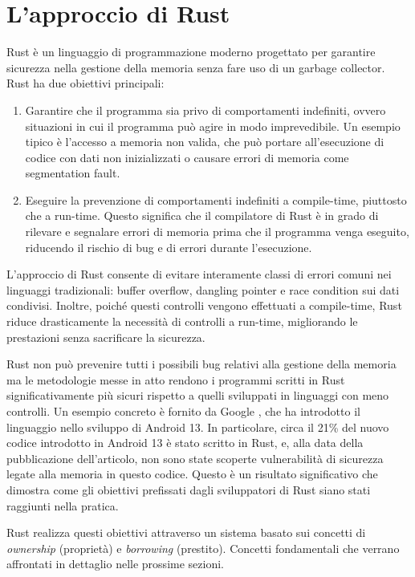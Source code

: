 \section{L'approccio di Rust}
Rust è un linguaggio di programmazione moderno progettato per garantire sicurezza nella gestione della memoria senza fare uso di un garbage collector. Rust ha due obiettivi principali:
\begin{enumerate}
    \item  Garantire che il programma sia privo di comportamenti indefiniti, ovvero situazioni in cui il programma può agire in modo imprevedibile. Un esempio tipico è l'accesso a memoria non valida, che può portare all'esecuzione di codice con dati non inizializzati o causare errori di memoria come segmentation fault. 
    \item Eseguire la prevenzione di comportamenti indefiniti a compile-time, piuttosto che a run-time. Questo significa che il compilatore di Rust è in grado di rilevare e segnalare errori di memoria prima che il programma venga eseguito, riducendo il rischio di bug e di errori durante l'esecuzione. 
\end{enumerate}
L'approccio di Rust consente di evitare interamente classi di errori comuni nei linguaggi tradizionali: buffer overflow, dangling pointer e race condition sui dati condivisi. Inoltre, poiché questi controlli vengono effettuati a compile-time, Rust riduce drasticamente la necessità di controlli a run-time, migliorando le prestazioni senza sacrificare la sicurezza. 

Rust non può prevenire tutti i possibili bug relativi alla gestione della memoria ma le metodologie messe in atto rendono i programmi scritti in Rust significativamente più sicuri rispetto a quelli sviluppati in linguaggi con meno controlli. Un esempio concreto è fornito da Google \cite{android13-memorysafe}, che ha introdotto il linguaggio nello sviluppo di Android 13. In particolare, circa il 21\% del nuovo codice introdotto in Android 13 è stato scritto in Rust, e, alla data della pubblicazione dell'articolo, non sono state scoperte vulnerabilità di sicurezza legate alla memoria in questo codice. Questo è un risultato significativo che dimostra come gli obiettivi prefissati dagli sviluppatori di Rust siano stati raggiunti nella pratica.

Rust realizza questi obiettivi attraverso un sistema basato sui concetti di \textit{ownership} (proprietà) e \textit{borrowing} (prestito). Concetti fondamentali che verrano affrontati in dettaglio nelle prossime sezioni.

